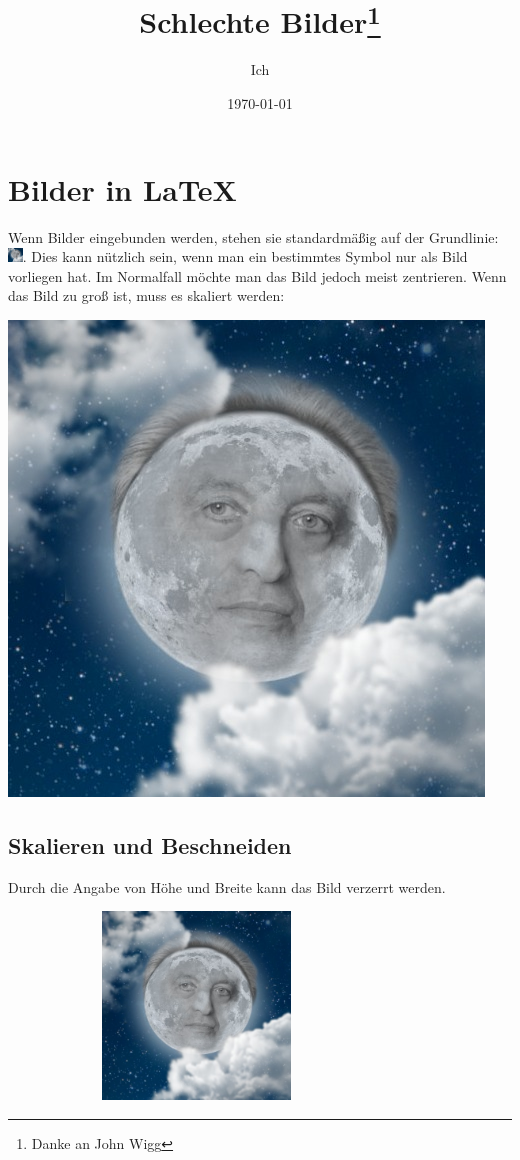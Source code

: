 \documentclass[a4paper, 10pt,onecolumn]{scrartcl}
\title{Schlechte Bilder\thanks{Danke an John Wigg}}
\author{Ich} %
\date{\today}
\begin{document}
\tableofcontents
\maketitle

\section{Bilder in \LaTeX}
Wenn Bilder eingebunden werden, stehen sie standardmäßig auf der Grundlinie: \includegraphics[width=11pt]{lotze.jpg}.
Dies kann nützlich sein, wenn man ein bestimmtes Symbol nur als Bild vorliegen hat. Im Normalfall möchte man das Bild jedoch meist zentrieren. Wenn das Bild zu groß ist, muss es skaliert werden:

\begin{center}
	\includegraphics[scale=0.5]{lotze.jpg}
\end{center}

\newpage

\subsection{Skalieren und Beschneiden}
Durch die Angabe von Höhe und Breite kann das Bild verzerrt werden.

\begin{center}
	\includegraphics[width=10cm, height= 5cm]{lotze.jpg}
\end{center}
\end{document}

